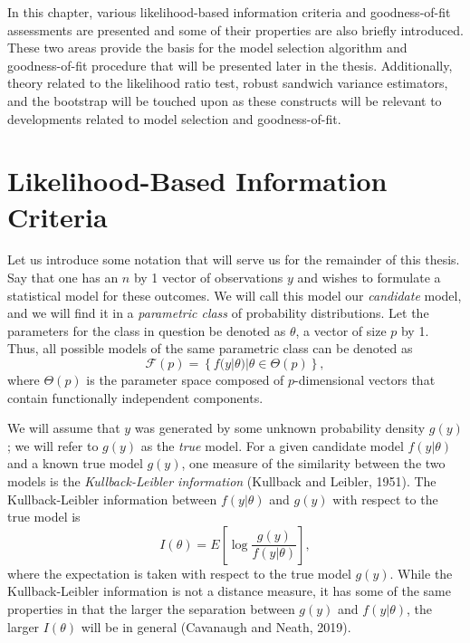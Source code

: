 \doublespace
{}
		In this chapter, various likelihood-based information criteria and goodness-of-fit assessments are presented and some of their properties are also briefly introduced.
		These two areas provide the basis for the model selection algorithm and goodness-of-fit procedure that will be presented later in the thesis. Additionally, theory
		related to the likelihood ratio test, robust sandwich variance estimators, and the bootstrap will be touched upon as these constructs will be relevant to developments
		related to model selection and goodness-of-fit.
		
		\section{Likelihood-Based Information Criteria}

		Let us introduce some notation that will serve us for the remainder of this thesis. Say that one has an $n$ by 1  vector of observations $y$ and wishes to formulate a
		statistical model for these outcomes. We will call this model our \textit{candidate} model, and we will find it in a \textit{parametric class} of probability distributions.
		Let the parameters for the class in question be denoted as $\theta$, a vector of size $p$ by 1. Thus, all possible models of the same parametric class can be denoted
		as
		\begin{equation*}
			\mathcal{F}(p) = \left\{ f(y|\theta) | \theta \in \Theta(p) \right\} ,
		\end{equation*}
		where $\Theta(p)$ is the parameter space composed of $p$-dimensional vectors that contain functionally independent components.

		We will assume that $y$ was generated by some unknown probability density $g(y)$; we will refer to $g(y)$ as the \textit{true} model. For a given candidate model $f(y|\theta)$
		and a known true model $g(y)$, one measure of the similarity between the two models is the \textit{Kullback-Leibler information} (Kullback and Leibler, 1951). The Kullback-Leibler
		information between $f(y|\theta)$ and $g(y)$ with respect to the true model is
		\begin{equation*}
			I(\theta) = E \left[ \log \frac{g(y)}{f(y|\theta)} \right],
		\end{equation*}
		where the expectation is taken with respect to the true model $g(y)$. While the Kullback-Leibler information is not a distance measure, it has some of the same properties in
		that the larger the separation between $g(y)$ and $f(y|\theta)$, the larger $I(\theta)$ will be in general (Cavanaugh and Neath, 2019).
		
